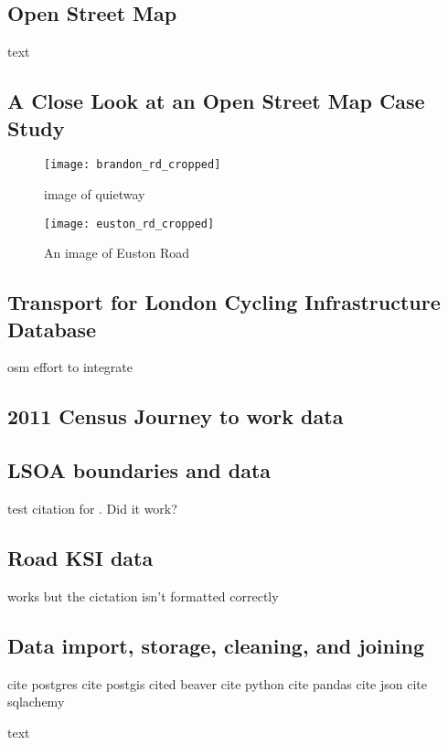 \subsection{Open Street Map}

text

\cite{osm}

\subsection{A Close Look at an Open Street Map Case Study}

\begin{figure}
\centering
\texttt{[image: brandon\_rd\_cropped]}
\caption{image of quietway}
\end{figure}

\begin{figure}
\centering
\texttt{[image: euston\_rd\_cropped]}
\caption{An image of Euston Road}
\label{fig:euston}
\end{figure}

\subsection{Transport for London Cycling Infrastructure Database}

\cite{tflcid}

osm effort to integrate

\subsection{2011 Census Journey to work data}

\cite{jtw}

\subsection{LSOA boundaries and data}
	
test citation for \cite{lsoageoms}. Did it work?
	
\subsection{Road KSI data}
	
	
	works but the cictation isn't formatted correctly
	\cite{cyclistksi}
	
\subsection{Data import, storage, cleaning, and joining}

cite postgres
cite postgis
cited beaver
cite python
cite pandas
cite json
cite sqlachemy

text